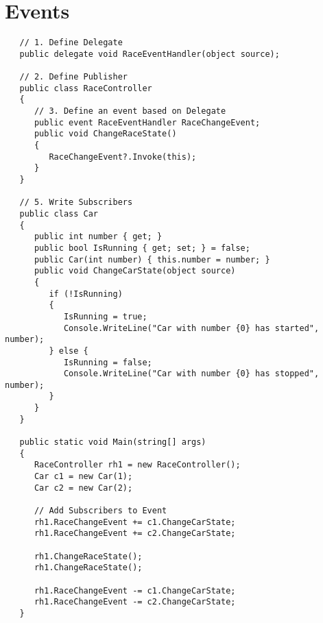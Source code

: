 \section{Events}
\begin{lstlisting}
   // 1. Define Delegate
   public delegate void RaceEventHandler(object source);

   // 2. Define Publisher
   public class RaceController
   {
      // 3. Define an event based on Delegate
      public event RaceEventHandler RaceChangeEvent;
      public void ChangeRaceState()
      {
         RaceChangeEvent?.Invoke(this);
      }
   }
    
   // 5. Write Subscribers
   public class Car
   {
      public int number { get; }
      public bool IsRunning { get; set; } = false;
      public Car(int number) { this.number = number; }
      public void ChangeCarState(object source)
      {
         if (!IsRunning)
         {
            IsRunning = true;
            Console.WriteLine("Car with number {0} has started", number);
         } else {
            IsRunning = false;
            Console.WriteLine("Car with number {0} has stopped", number);
         }
      }
   }

   public static void Main(string[] args)
   {
      RaceController rh1 = new RaceController();
      Car c1 = new Car(1);
      Car c2 = new Car(2);

      // Add Subscribers to Event
      rh1.RaceChangeEvent += c1.ChangeCarState;
      rh1.RaceChangeEvent += c2.ChangeCarState;
      
      rh1.ChangeRaceState();
      rh1.ChangeRaceState();

      rh1.RaceChangeEvent -= c1.ChangeCarState;
      rh1.RaceChangeEvent -= c2.ChangeCarState;
   }
\end{lstlisting}